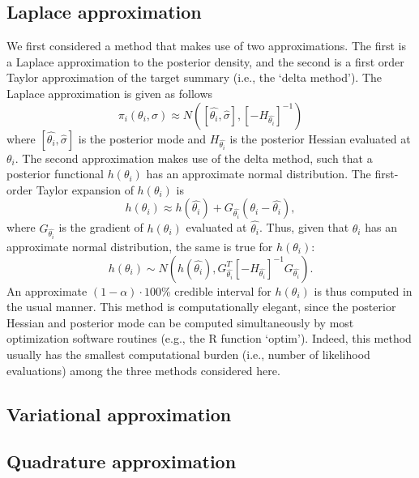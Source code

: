 \documentclass{article}
\begin{document}
\subsection{Laplace approximation}
We first considered a method that makes use of two approximations. The first is a Laplace approximation to the posterior density, and the second is a first order Taylor approximation of the target summary (i.e., the `delta method'). The Laplace approximation is given as follows
\begin{displaymath}
\pi_i(\theta_i, \sigma) \approx N([\hat{\theta_i},\hat{\sigma}], [-H_{\hat{\theta_i}}]^{-1})
\end{displaymath} 
\noindent where $[\hat{\theta_i},\hat{\sigma}]$ is the posterior mode and $H_{\hat{\theta_i}}$ is the posterior Hessian evaluated at $\theta_i$. The second approximation makes use of the delta method, such that a posterior functional $h(\theta_i)$ has an approximate normal distribution. The first-order Taylor expansion of $h(\theta_i)$ is 
\begin{displaymath}
h(\theta_i) \approx  h(\hat{\theta_i}) + G_{\hat{\theta_i}}(\theta_i - \hat{\theta_i}),
\end{displaymath}
\noindent where $G_{\hat{\theta_i}}$ is the gradient of $h(\theta_i)$ evaluated at $\hat{\theta_i}$. Thus, given that $\theta_i$ has an approximate normal distribution, the same is true for $h(\theta_i)$:
\begin{displaymath}
h(\theta_i) \sim N(h(\hat{\theta_i}), G^T_{\hat{\theta_i}}[-H_{\hat{\theta_i}}]^{-1}G_{\hat{\theta_i}}). 
\end{displaymath}
\noindent An approximate $(1-\alpha)\cdot 100$\% credible interval for $h(\theta_i)$ is thus computed in the usual manner. This method is computationally elegant, since the posterior Hessian and posterior mode can be computed simultaneously by most optimization software routines (e.g., the R function `optim'). Indeed, this method usually has the smallest computational burden (i.e., number of likelihood evaluations) among the three methods considered here.

\subsection{Variational approximation}
\subsection{Quadrature approximation}
\end{document}
